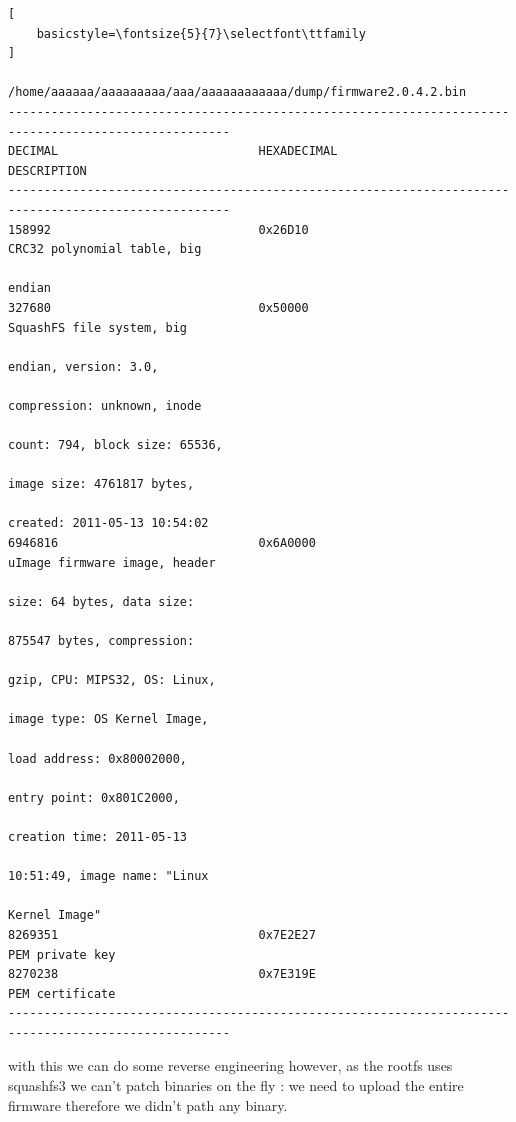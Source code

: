 \documentclass{article}
\begin{document}
\begin{lstlisting}[
    basicstyle=\fontsize{5}{7}\selectfont\ttfamily
]
                  /home/aaaaaa/aaaaaaaaa/aaa/aaaaaaaaaaaa/dump/firmware2.0.4.2.bin
-----------------------------------------------------------------------------------------------------
DECIMAL                            HEXADECIMAL                        DESCRIPTION
-----------------------------------------------------------------------------------------------------
158992                             0x26D10                            CRC32 polynomial table, big 
                                                                      endian
327680                             0x50000                            SquashFS file system, big 
                                                                      endian, version: 3.0, 
                                                                      compression: unknown, inode 
                                                                      count: 794, block size: 65536, 
                                                                      image size: 4761817 bytes, 
                                                                      created: 2011-05-13 10:54:02
6946816                            0x6A0000                           uImage firmware image, header 
                                                                      size: 64 bytes, data size: 
                                                                      875547 bytes, compression: 
                                                                      gzip, CPU: MIPS32, OS: Linux, 
                                                                      image type: OS Kernel Image, 
                                                                      load address: 0x80002000, 
                                                                      entry point: 0x801C2000, 
                                                                      creation time: 2011-05-13 
                                                                      10:51:49, image name: "Linux 
                                                                      Kernel Image"
8269351                            0x7E2E27                           PEM private key
8270238                            0x7E319E                           PEM certificate
-----------------------------------------------------------------------------------------------------
\end{lstlisting}

with this we can do some reverse engineering however, as the rootfs uses squashfs3 we can't patch binaries on the fly : we need to upload the entire firmware therefore we didn't path any binary.
\end{document}
